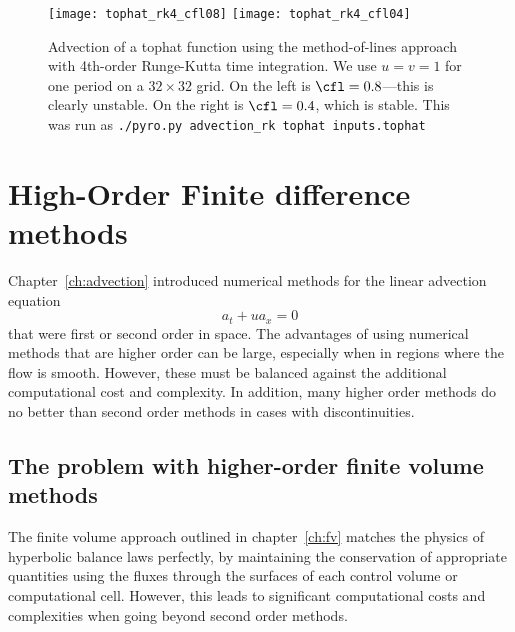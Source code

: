 %
\begin{figure}
\centering
\texttt{[image: tophat\_rk4\_cfl08]}\hspace{1em}
\texttt{[image: tophat\_rk4\_cfl04]}
\caption[Advection of tophat function with method-of-lines integration]
  {\label{fig:adv:tophat-2d-rk4} Advection of a tophat function using
  the method-of-lines approach with 4th-order Runge-Kutta time integration.
  We use $u = v = 1$ for one period on a $32\times 32$ grid.  On the left
  is $\cfl = 0.8$---this is clearly unstable.  On the right is $\cfl = 0.4$,
  which is stable.
  This was run as {\tt ./pyro.py advection\_rk tophat inputs.tophat}}
\end{figure}



\section{High-Order Finite difference methods}
\label{sec:ho-fd}

Chapter~\ref{ch:advection} introduced numerical methods for the linear
advection equation
\begin{equation}
\label{eq:ho-advect}
a_t + u a_x = 0
\end{equation}
that were first or second order in space. The advantages of using numerical
methods that are higher order can be large, especially when in regions where
the flow is smooth. However, these must be balanced against the additional
computational cost and complexity. In addition, many higher order methods do no
better than second order methods in cases with discontinuities.

\subsection{The problem with higher-order finite volume methods}

The finite volume approach outlined in chapter~\ref{ch:fv}
matches the physics of hyperbolic balance
laws perfectly, by maintaining the conservation of appropriate quantities using
the fluxes through the surfaces of each control volume or computational cell.
However, this leads to significant computational costs and complexities when
going beyond second order methods.

